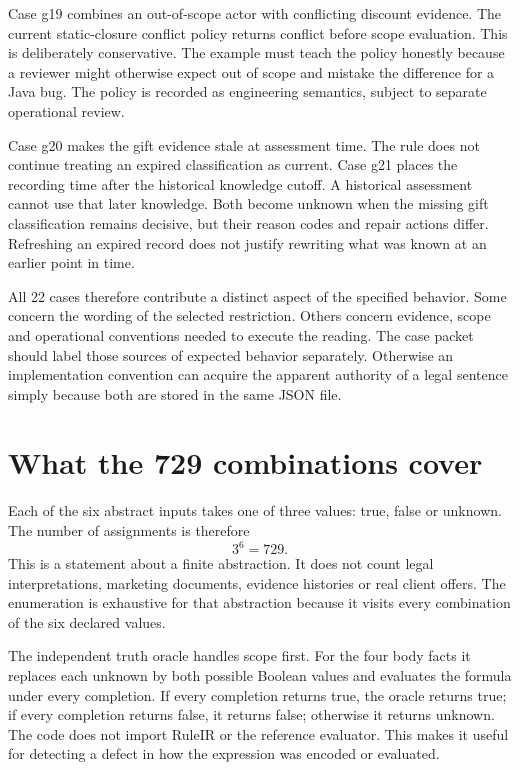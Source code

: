 \documentclass[12pt,a4paper,oneside,openany]{book}
\begin{document}
Case g19 combines an out-of-scope actor with conflicting discount evidence.
The current static-closure conflict policy returns conflict before scope
evaluation. This is deliberately conservative. The example must teach the
policy honestly because a reviewer might otherwise expect out of scope and
mistake the difference for a Java bug. The policy is recorded as engineering
semantics, subject to separate operational review.

Case g20 makes the gift evidence stale at assessment time. The rule does not
continue treating an expired classification as current. Case g21 places the
recording time after the historical knowledge cutoff. A historical assessment
cannot use that later knowledge. Both become unknown when the missing gift
classification remains decisive, but their reason codes and repair actions
differ. Refreshing an expired record does not justify rewriting what was known
at an earlier point in time.

All 22 cases therefore contribute a distinct aspect of the specified behavior.
Some concern the wording of the selected restriction. Others concern evidence,
scope and operational conventions needed to execute the reading. The case
packet should label those sources of expected behavior separately. Otherwise
an implementation convention can acquire the apparent authority of a legal
sentence simply because both are stored in the same JSON file.

\section{What the 729 combinations cover}
\label{merge:M02:04}

\label{sec:circular-enumeration}
Each of the six abstract inputs takes one of three values: true, false or
unknown. The number of assignments is therefore
\begin{equation}
 3^6=729.
 \label{eq:case-domain-size}
\end{equation}
This is a statement about a finite abstraction. It does not count legal
interpretations, marketing documents, evidence histories or real client offers.
The enumeration is exhaustive for that abstraction because it visits every
combination of the six declared values.

The independent truth oracle handles scope first. For the four body facts it
replaces each unknown by both possible Boolean values and evaluates the formula
under every completion. If every completion returns true, the oracle returns
true; if every completion returns false, it returns false; otherwise it returns
unknown. The code does not import RuleIR or the reference evaluator. This makes
it useful for detecting a defect in how the expression was encoded or evaluated.
\end{document}
